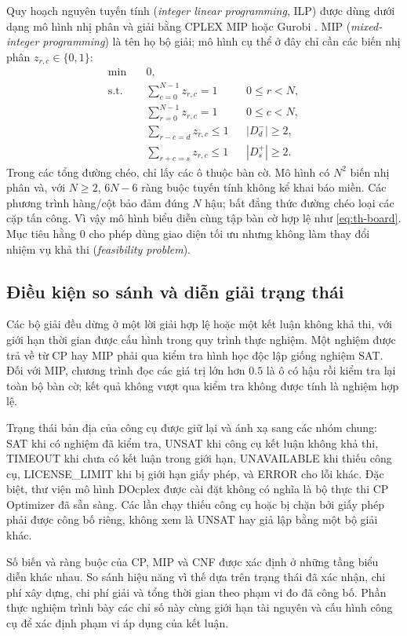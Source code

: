 Quy hoạch nguyên tuyến tính (\emph{integer linear programming}, ILP)
được dùng dưới dạng mô hình nhị phân và giải bằng CPLEX MIP
\cite{ibm} hoặc Gurobi \cite{gurobi}. MIP
(\emph{mixed-integer programming}) là tên họ bộ giải; mô hình cụ thể
ở đây chỉ cần các biến nhị phân $z_{r,c}\in\{0,1\}$:
\begin{align}
 \min\quad &0,\\
 \text{s.t.}\quad
 &\sum_{c=0}^{N-1}z_{r,c}=1 &&0\leq r<N,\label{eq:th-mip-row}\\
 &\sum_{r=0}^{N-1}z_{r,c}=1 &&0\leq c<N,\label{eq:th-mip-column}\\
 &\sum_{r-c=d}z_{r,c}\leq1 &&|D^-_d|\geq2,\\
 &\sum_{r+c=s}z_{r,c}\leq1 &&|D^+_s|\geq2.
 \label{eq:th-mip-diag}
\end{align}
Trong các tổng đường chéo, chỉ lấy các ô thuộc bàn cờ. Mô hình có
$N^2$ biến nhị phân và, với $N\geq2$, $6N-6$ ràng buộc tuyến tính
không kể khai báo miền. Các phương trình hàng/cột bảo đảm đúng $N$
hậu; bất đẳng thức đường chéo loại các cặp tấn công. Vì vậy mô hình
biểu diễn cùng tập bàn cờ hợp lệ như \eqref{eq:th-board}. Mục tiêu
hằng 0 cho phép dùng giao diện tối ưu nhưng không làm thay đổi nhiệm
vụ khả thi (\emph{feasibility problem}).

\subsection{Điều kiện so sánh và diễn giải trạng thái}

Các bộ giải đều dừng ở một lời giải hợp lệ hoặc một kết luận không
khả thi, với giới hạn thời gian được cấu hình trong quy trình thực
nghiệm. Một nghiệm được trả về từ CP hay MIP phải qua kiểm tra hình
học độc lập giống nghiệm SAT. Đối với MIP, chương trình đọc các giá
trị lớn hơn $0.5$ là ô có hậu rồi kiểm tra lại toàn bộ bàn cờ; kết
quả không vượt qua kiểm tra không được tính là nghiệm hợp lệ.

Trạng thái bản địa của công cụ được giữ lại và ánh xạ sang các nhóm
chung: SAT khi có nghiệm đã kiểm tra, UNSAT khi công cụ kết luận không
khả thi, TIMEOUT khi chưa có kết luận trong giới hạn, UNAVAILABLE khi
thiếu công cụ, LICENSE\_LIMIT khi bị giới hạn giấy phép, và ERROR cho
lỗi khác. Đặc biệt, thư viện mô hình DOcplex được cài đặt không có
nghĩa là bộ thực thi CP Optimizer đã sẵn sàng. Các lần chạy thiếu công
cụ hoặc bị chặn bởi giấy phép phải được công bố riêng, không xem là
UNSAT hay giả lập bằng một bộ giải khác.

Số biến và ràng buộc của CP, MIP và CNF được xác định ở những tầng
biểu diễn khác nhau. So sánh hiệu năng vì thế dựa trên trạng thái đã
xác nhận, chi phí xây dựng, chi phí giải và tổng thời gian theo phạm
vi đo đã công bố. Phần thực nghiệm trình bày các chỉ số này cùng
giới hạn tài nguyên và cấu hình công cụ để xác định phạm vi áp dụng
của kết luận.

